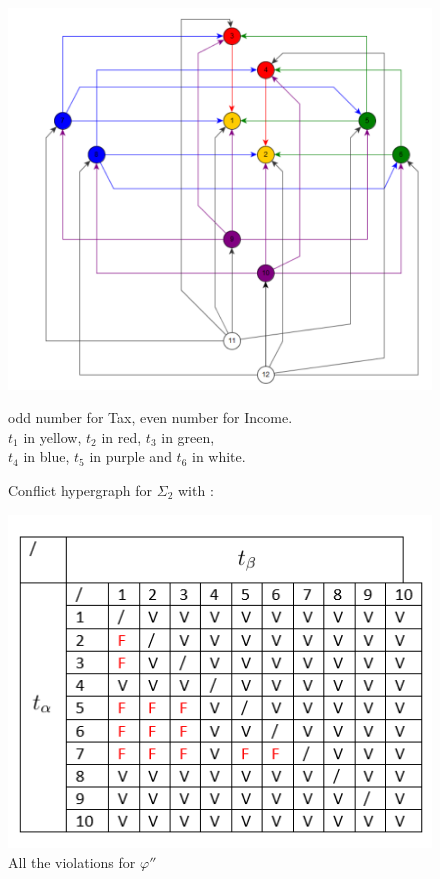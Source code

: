 \documentclass[letterpaper, 12pt]{report}
\theoremstyle{definition}
\begin{document}
\begin{figure}
\centering
\hspace*{-1.8cm} \includegraphics[scale=0.95]{img/graph2}
\caption{\label{graphSigma2}Conflict hypergraph for $\Sigma_2$ with :}
	odd number for Tax, even number for Income. \\
	$t_1$ in yellow, $t_2$ in red, $t_3$ in green,\\
	$t_4$ in blue, $t_5$ in purple and $t_6$ in white.
\end{figure}

\begin{figure}
\centering
\includegraphics[scale=1]{img/TaxEqual}
\caption{\label{EqualTax}All the violations for $\varphi''$}
\end{figure}
\end{document}
